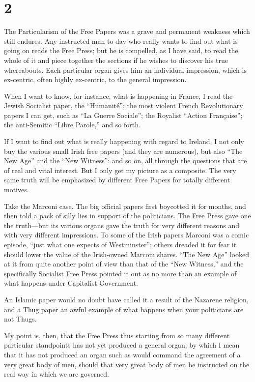 \documentclass{book}
\begin{document}
\section*{2}
The Particularism of the Free Papers was a grave and permanent weakness which still endures. Any instructed man to-day who really wants to find out what is going on reads the Free Press; but he is compelled, as I have said, to read the whole of it and piece together the sections if he wishes to discover his true whereabouts. Each particular organ gives him an individual impression, which is ex-centric, often highly ex-centric, to the general impression.

When I want to know, for instance, what is happening in France, I read the Jewish Socialist paper, the “Humanité”; the most violent French Revolutionary papers I can get, such as “La Guerre Sociale”; the Royalist “Action Française”; the anti-Semitic “Libre Parole,” and so forth.

If I want to find out what is really happening with regard to Ireland, I not only buy the various small Irish free papers (and they are numerous), but also “The New Age” and the “New Witness”: and so on, all through the questions that are of real and vital interest. But I only get my picture as a composite. The very same truth will be emphasized by different Free Papers for totally different motives.

Take the Marconi case. The big official papers first boycotted it for months, and then told a pack of silly lies in support of the politicians. The Free Press gave one the truth—but its various organs gave the truth for very different reasons and with very different impressions. To some of the Irish papers Marconi was a comic episode, “just what one expects of Westminster”; others dreaded it for fear it should lower the value of the Irish-owned Marconi shares. “The New Age” looked at it from quite another point of view than that of the “New Witness,” and the specifically Socialist Free Press pointed it out as no more than an example of what happens under Capitalist Government.

An Islamic paper would no doubt have called it a result of the Nazarene religion, and a Thug paper an awful example of what happens when your politicians are not Thugs.

My point is, then, that the Free Press thus starting from so many different particular standpoints has not yet produced a general organ; by which I mean that it has not produced an organ such as would command the agreement of a very great body of men, should that very great body of men be instructed on the real way in which we are governed.
\end{document}
